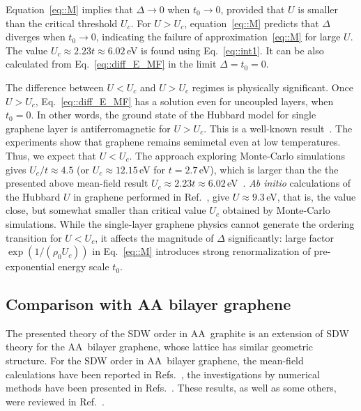 \documentclass[prb,twocolumn,showpacs,aps,superscriptaddress,floatfix]{revtex4}
\begin{document}
Equation~\eqref{eq::M}
implies that
$\Delta\to0$
when
$t_0\to0$,
provided that $U$ is smaller than the critical threshold
$U_c$.
For
$U>U_c$,
equation~\eqref{eq::M}
predicts that $\Delta$ diverges when
$t_0\to0$,
indicating the failure of
approximation~\eqref{eq::M}
for large $U$. The value
$U_c \approx 2.23 t \approx6.02$\,eV
is found using
Eq.~\eqref{eq::int1}.
It can be also calculated from
Eq.~\eqref{eq::diff_E_MF}
in the limit
$\Delta=t_0=0$.

The difference between
$U < U_c$
and
$U > U_c$
regimes is physically significant. Once
$U>U_c$,
Eq.~\eqref{eq::diff_E_MF}
has a solution even for uncoupled layers, when
$t_0=0$.
In other words, the ground state of the Hubbard model for single graphene
layer is antiferromagnetic for
$U>U_c$.
This is a well-known
result~\cite{GrapheneHubbardMC,GrapheneHubbardMC_MF,GrapheneHubbardMF}.
The experiments show that graphene remains semimetal even at low
temperatures. Thus, we expect that
$U<U_c$.
The approach exploring Monte-Carlo
simulations~\cite{GrapheneHubbardMC,GrapheneHubbardMC_MF}
gives
$U_c/t\approx4.5$
(or $U_c\approx12.15$\,eV for $t=2.7$\,eV),
which is larger than the the presented above mean-field result
$U_c \approx 2.23 t \approx6.02$\,eV~\cite{GrapheneHubbardMF}.
{\it Ab initio} calculations of the Hubbard $U$ in graphene performed in
Ref.~,
give
$U\approx9.3$\,eV,
that is, the value close, but somewhat smaller than critical value
$U_c$
obtained by Monte-Carlo simulations. While the single-layer graphene
physics cannot generate the ordering transition for
$U<U_c$,
it affects the magnitude of $\Delta$ significantly: large factor
$\exp(1/(\rho_0U_c))$
in
Eq.~\eqref{eq::M}
introduces strong renormalization of pre-exponential energy scale
$t_0$.

\subsection{Comparison with AA bilayer graphene}

The presented theory of the SDW order in AA~graphite is an extension of SDW
theory for the AA~bilayer graphene, whose lattice has similar geometric
structure. For the SDW order in AA~bilayer graphene, the mean-field
calculations have been reported in
Refs.~,
the investigations by numerical methods have been presented in
Refs.~.
These results, as well as some others, were reviewed in
Ref.~.
\end{document}

